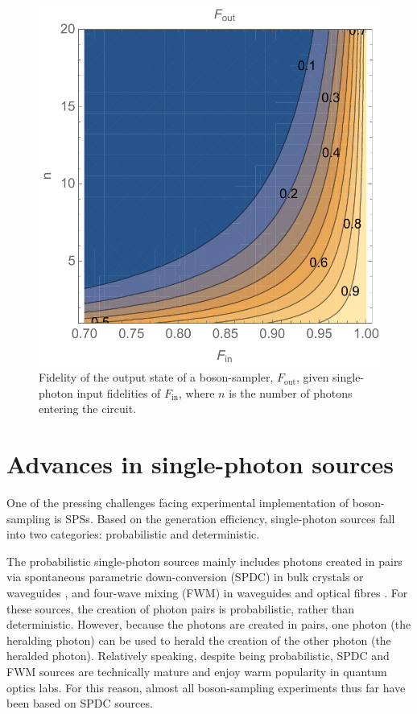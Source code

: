 \documentclass[aps,rmp,twocolumn,amsmath,amssymb,nofootinbib,superscriptaddress]{revtex4}
\begin{document}
\begin{figure}[!htb]
\includegraphics[width=\columnwidth]{fidelity}
\caption{Fidelity of the output state of a boson-sampler, $F_\mathrm{out}$, given single-photon input fidelities of $F_\mathrm{in}$, where $n$ is the number of photons entering the circuit.} \label{fig:fidelity}
\end{figure}

\section{Advances in single-photon sources} \label{sec:adv_sources}

One of the pressing challenges facing experimental implementation of boson-sampling is SPSs. Based on the generation efficiency, single-photon sources fall into two categories: probabilistic and deterministic.

The probabilistic single-photon sources mainly includes photons created in pairs via spontaneous parametric down-conversion (SPDC) in bulk crystals \cite{bib:39, bib:40} or waveguides \cite{bib:41, bib:42}, and four-wave mixing (FWM) in waveguides \cite{bib:43, bib:44} and optical fibres \cite{bib:45, bib:46}. For these sources, the creation of photon pairs is probabilistic, rather than deterministic. However, because the photons are created in pairs, one photon (the heralding photon) can be used to herald the creation of the other photon (the heralded photon). Relatively speaking, despite being probabilistic, SPDC and FWM sources are technically mature and enjoy warm popularity in quantum optics labs. For this reason, almost all boson-sampling experiments thus far have been based on SPDC sources. 
\end{document}
